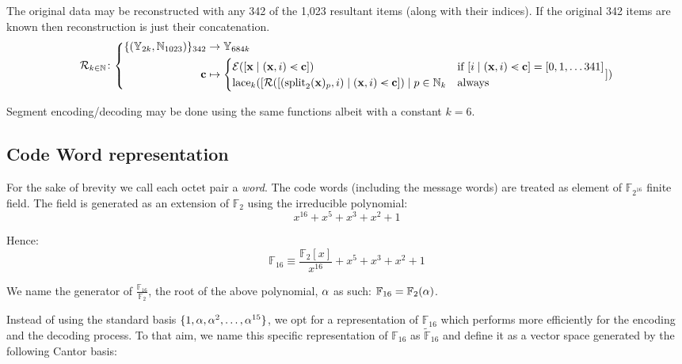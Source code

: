 The original data may be reconstructed with any 342 of the 1,023 resultant items (along with their indices). If the original 342 items are known then reconstruction is just their concatenation.
\begin{equation}\label{eq:erasurecodinginv}
  \ecrecover_{k \in \N}\colon\left\{\begin{aligned}
    \{(\blob_{2k}, \N_{1023})\}_{342} &\to \blob_{684k} \\
    \mathbf{c} &\mapsto \begin{cases}
      \se([\mathbf{x} \mid (\mathbf{x}, i) \orderedin \mathbf{c}]) &\when [i \mid (\mathbf{x}, i) \orderedin \mathbf{c}] = [0, 1, \dots 341]\\
      \lace_k([
        \ecrecover([(\spl_2(\mathbf{x})_p, i) \mid (\mathbf{x}, i) \orderedin \mathbf{c}])
      \mid p \in \N_k &\text{always}\\
    \end{cases}
    ])
  \end{aligned}\right.
\end{equation}



Segment encoding/decoding may be done using the same functions albeit with a constant $k = 6$.

\subsection{Code Word representation}

For the sake of brevity we call each octet pair a \emph{word}. The code words (including the message words) are treated as element of $\mathbb{F}_{2^{16}}$ finite field. The field is generated as an extension of $\mathbb{F}_2$ using the irreducible polynomial:
\begin{equation}
x^{16} + x^5 + x^3 + x^2 + 1
\end{equation}

Hence:
\begin{equation}
\mathbb{F}_{16} \equiv \frac{\mathbb{F}_2[x]}{x^{16}} + x^5 + x^3 + x^2 + 1
\end{equation}

We name the generator of $\frac{\mathbb{F}_{16}}{\mathbb{F}_2}$, the root of the above polynomial, $\alpha$ as such: $\mathbb{F}_{16} = \mathbb{F}_2(\alpha)$.

Instead of using the standard basis $\{1, \alpha, \alpha^2, \dots, \alpha^{15}\}$, we opt for a representation of $\mathbb{F}_{16}$ which performs more efficiently for the encoding and the decoding process. To that aim, we name this specific representation of $\mathbb{F}_{16}$ as $\tilde{\mathbb{F}}_{16}$ and define it as a vector space generated by the following Cantor basis:

